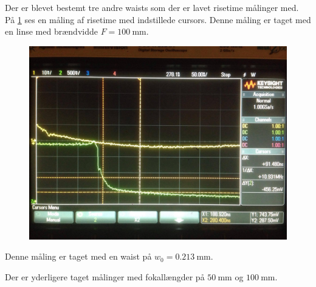 \documentclass[main]{subfiles}
\begin{document}
Der er blevet bestemt tre andre waists som der er lavet risetime målinger med.
På \cref{fig:screenfigur} ses en måling af risetime med indstillede cursors. Denne måling er taget med en linse med brændvidde $F = \SI{100}{\milli\meter}$.
\begin{figure}[H]
  \includegraphics[width=\linewidth]{tegninger/screenfigur.png}
  \caption{}
  \label{fig:screenfigur}
\end{figure}
Denne måling er taget med en waist på $w_0 = \SI{0,213}{\milli\meter}$.

Der er yderligere taget målinger med fokallængder på $\SI{50}{\milli\meter}$ og $\SI{100}{\milli\meter}$.
\end{document}
